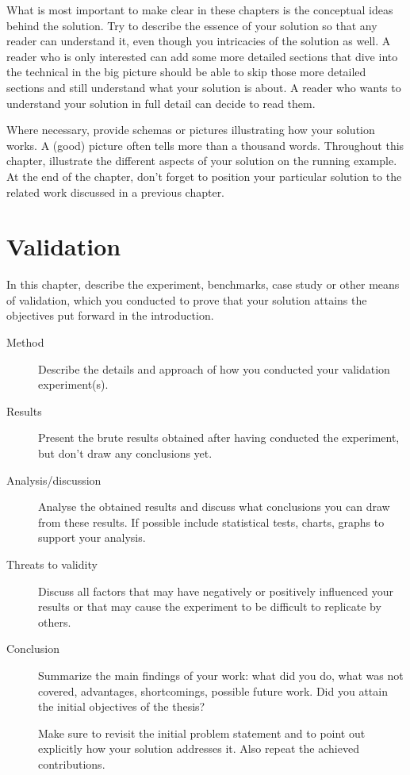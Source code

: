 \documentclass[twocolumn,british]{article}
\begin{document}
What is most important to make clear in these chapters is the
conceptual ideas behind the solution. Try to describe the essence of
your solution so that any reader can understand it, even though you
intricacies of the solution as well. A reader who is only interested
can add some more detailed sections that dive into the technical in
the big picture should be able to skip those more detailed sections
and still understand what your solution is about. A reader who wants
to understand your solution in full detail can decide to read them.

Where necessary, provide schemas or pictures illustrating how your
solution works. A (good) picture often tells more than a thousand
words. Throughout this chapter, illustrate the different aspects of
your solution on the running example. At the end of the chapter, don’t
forget to position your particular solution to the related work
discussed in a previous chapter.

\section*{Validation}

In this chapter, describe the experiment, benchmarks, case study or
other means of validation, which you conducted to prove that your
solution attains the objectives put forward in the introduction.

\begin{description}

\item[Method] Describe the details and approach of how you conducted
  your validation experiment(s).

\item[Results] Present the brute results obtained after having
  conducted the experiment, but don’t draw any conclusions yet.

\item[Analysis/discussion] Analyse the obtained results and discuss
  what conclusions you can draw from these results. If possible
  include statistical tests, charts, graphs to support your analysis.

\item[Threats to validity] Discuss all factors that may have
  negatively or positively influenced your results or that may cause
  the experiment to be difficult to replicate by others.

\item[Conclusion] Summarize the main findings of your work: what did
  you do, what was not covered, advantages, shortcomings, possible
  future work. Did you attain the initial objectives of the thesis?

  Make sure to revisit the initial problem statement and to point out
  explicitly how your solution addresses it. Also repeat the achieved
  contributions.

\end{description}
\end{document}
